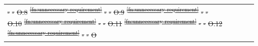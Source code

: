 \documentclass[a4paper,12pt,twoside]{article}
\providecommand{\DIFdeltex}[1]{{\protect\color{red}\sout{#1}}}                      %
\providecommand{\DIFaddbegin}{} %
\providecommand{\DIFdelend}{} %
\providecommand{\DIFdel}[1]{\texorpdfstring{\DIFdeltex{#1}}{}} %
\newcommand{\DIFaddincludegraphics}[2][]{{\color{blue}\fbox{\DIFOincludegraphics[#1]{#2}}}} %
\DeclareRobustCommand{\DIFaddbegin}{\DIFOaddbegin \let\includegraphics\DIFaddincludegraphics} %
\DeclareRobustCommand{\DIFdelend}{\DIFOaddend \let\includegraphics\DIFOincludegraphics} %
\begin{document}
\begin{longtable}[]{|m{}| m{} |m{} |m{}|m{}|}
\DIFdel{-       }%
\DIFdel{-         }%
\DIFdel{O.8  }%
\DIFdel{\textsuperscript{\ref{fn:unnecessary-requirement}}                                                                         }%
\DIFdel{-         }%
\DIFdel{-  }%
\DIFdel{O.9  }%
\DIFdel{\textsuperscript{\ref{fn:unnecessary-requirement}}                                                                                                  }%
\DIFdel{-      }%
\DIFdel{-           }%
\DIFdel{O.10 }%
\DIFdel{\textsuperscript{\ref{fn:unnecessary-requirement}}               }%
\DIFdel{-        }%
\DIFdel{-          }%
\DIFdel{O.11 }%
\DIFdel{\textsuperscript{\ref{fn:unnecessary-requirement}}                                                                                }%
\DIFdel{-      }%
\DIFdel{-            }%
\DIFdel{O.12 }%
\DIFdel{\textsuperscript{\ref{fn:unnecessary-requirement}}                                                                      }%
\DIFdel{-        }%
\DIFdel{-    }%
\DIFdel{O}\DIFdelend \DIFaddbegin 


\end{longtable}
\end{document}
